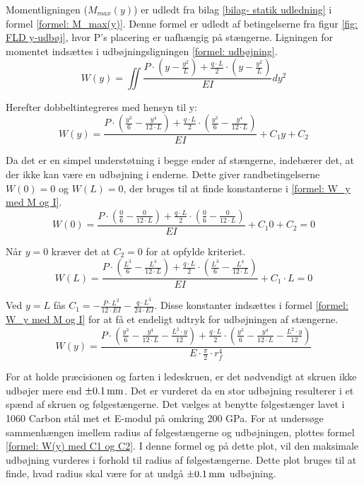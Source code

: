 Momentligningen ($M_{max}(y)$) er udledt fra bilag \ref{bilag- statik udledning} i formel \ref{formel: M_max(y)}. Denne formel er udledt af betingelserne fra figur \ref{fig: FLD y-udbøj}, hvor P's placering er uafhængig på stængerne. Ligningen for momentet indsættes i udbøjningsligningen \ref{formel: udbøjning}.
\begin{equation}
    W(y)=\iint \frac{P\cdot \left(y-\frac{y^2}{L}\right)+\frac {q\cdot L}{2}\cdot\left( y-\frac{y^2}{L}\right)}{EI}dy^2
\end{equation}

Herefter dobbeltintegreres med hensyn til y:
\begin{equation} \label{formel: W_y med M og I}
   W(y)= \frac{P\cdot \left(\frac{y^3}{6}-\frac{y^4}{12\cdot L}\right)+\frac {q\cdot L}{2}\cdot\left(\frac{y^3}{6}-\frac{y^4}{12\cdot L}\right)}{EI} + C_1 y+C_2
\end{equation}

Da det er en simpel understøtning i begge ender af stængerne, indebærer det, at der ikke kan være en udbøjning i enderne. Dette giver randbetingelserne $W(0)=0$ og $W(L)=0$, der bruges til at finde konstanterne i \ref{formel: W_y med M og I}.
\begin{equation} \label{formel: W(0)}
        W(0)= \frac{P\cdot \left(\frac{0}{6}-\frac{0}{12\cdot L}\right)+\frac {q\cdot L}{2}\cdot\left(\frac{0}{6}-\frac{0}{12\cdot L}\right)}{EI} + C_1 0+C_2=0
\end{equation}

Når $y=0$ kræver det at $C_2=0$ for at opfylde kriteriet.
\begin{equation} \label{formel: W(L)}
       W(L)=\frac{P\cdot \left(\frac{L^3}{6}-\frac{L^4}{12\cdot L}\right)+\frac {q\cdot L}{2}\cdot\left(\frac{L^3}{6}-\frac{L^4}{12\cdot L}\right) }{EI} + C_1\cdot L=0
\end{equation} 

Ved $y=L$ fås $C_1=-\frac{P\cdot L^2}{12\cdot EI}-\frac{q\cdot L^3}{24\cdot EI}$. Disse konstanter indsættes i formel \ref{formel: W_y med M og I} for at få et endeligt udtryk for udbøjningen af stængerne.
\begin{equation} \label{formel: W(y) med C1 og C2}
   W(y)= \frac{P\cdot \left(\frac{y^3}{6}-\frac{y^4}{12\cdot L}-\frac{L^2\cdot y}{12}\right)+\frac {q\cdot L}{2}\cdot\left(\frac{y^3}{6}-\frac{y^4}{12\cdot L}-\frac{L^2\cdot y}{12}\right)}{E\cdot\frac{\pi}{2}\cdot r_f^4}
\end{equation}

For at holde præcisionen og farten i ledeskruen, er det nødvendigt at skruen ikke udbøjer mere end \(\SI{\pm0,1}{mm}\). Det er vurderet da en stor udbøjning resulterer i et spænd af skruen og følgestængerne. Det vælges at benytte følgestænger lavet i 1060 Carbon stål met et E-modul på omkring 200 GPa. For at undersøge sammenhængen imellem radius af følgestængerne og udbøjningen, plottes formel \ref{formel: W(y) med C1 og C2}. I denne formel og på dette plot, vil den maksimale udbøjning vurderes i forhold til radius af følgestængerne. Dette plot bruges til at finde, hvad radius skal være for at undgå \(\SI{\pm0,1}{mm}\) udbøjning.

